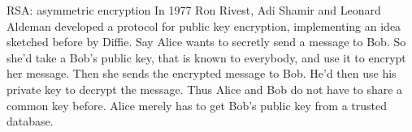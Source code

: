 \documentclass[final,hyperref={pdfpagelabels=false}]{beamer}
\begin{document}
\begin{frame}{}
\begin{columns}[t]
\begin{column}{.3\linewidth}
        \begin{block}{RSA: asymmetric encryption}
          In 1977 Ron Rivest, Adi Shamir and Leonard Aldeman developed a protocol for public key encryption, implementing an idea sketched before by Diffie. Say Alice wants to secretly send a message to Bob. So she'd take a Bob's public key, that is known to everybody, and use it to encrypt her message. Then she sends the encrypted message to Bob. He'd then use his private key to decrypt the message. Thus Alice and Bob do not have to share a common key before. Alice merely has to get Bob's public key from a trusted database.
        \end{block}
      \end{column}
    \end{columns}
  \end{frame}
\end{document}
